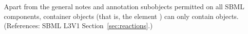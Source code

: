 Apart from the general notes and annotation subobjects permitted on all
SBML components, \ListOfModifierSpeciesReferences container objects (that
is, the \Reaction element ) can only contain
\ModifierSpeciesReference objects.  (References: SBML L3V1
Section~\ref{sec:reactions}.)
